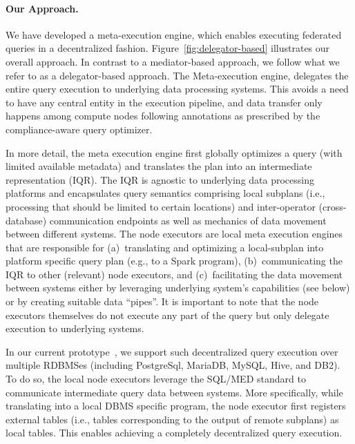 \documentclass[11pt]{article}
\begin{document}
\paragraph{Our Approach.} We have
developed a meta-execution engine, which enables executing
federated queries in a decentralized fashion.
Figure~\ref{fig:delegator-based} illustrates our overall
approach. In contrast to a mediator-based approach, we
follow what we refer to as a delegator-based approach. The
Meta-execution engine, delegates the entire query execution
to underlying data processing systems. This avoids a need to
have any central entity in the execution pipeline, and data
transfer only happens among compute nodes following
annotations as prescribed by the compliance-aware query
optimizer.

In more detail, the meta execution engine first globally
optimizes a query (with limited available metadata) and
translates the plan into an intermediate representation
(IQR). The IQR is agnostic to underlying data processing
platforms and encapsulates query semantics comprising local
subplans (i.e., processing that should be limited to certain
locations) and inter-operator (cross-database) communication
endpoints as well as mechanics of data movement between
different systems. The node executors are local meta
execution engines that are responsible for (a)~translating
and optimizing a local-subplan into platform specific query
plan (e.g., to a Spark program), (b)~communicating the IQR
to other (relevant) node executors, and (c)~facilitating the
data movement between systems either by leveraging
underlying system's capabilities (see below) or by creating
suitable data ``pipes''. It is important to note that the
node executors themselves do not execute any part of the
query but only delegate execution to underlying systems.



In our current prototype~\cite{cqp-vldb}, we support such
decentralized query execution over multiple RDBMSes
(including PostgreSql, MariaDB, MySQL, Hive, and DB2). To do
so, the local node executors leverage the SQL/MED standard
to communicate intermediate query data between systems. More
specifically, while translating into a local DBMS specific
program, the node executor first registers external tables
(i.e., tables corresponding to the output of remote
subplans) as local tables. This enables achieving a
completely decentralized query execution.
\end{document}
